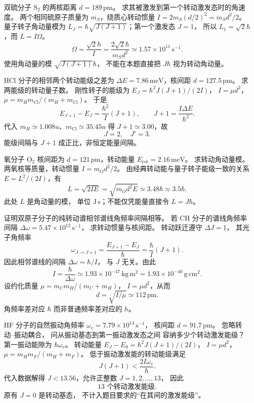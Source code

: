双硫分子 $\mathrm{S_2}$ 的两核距离 $d=189\,\mathrm{pm}$。
求其被激发到第一个转动激发态时的角速度。
\exsolution
两个相同硫原子质量为 $m_S$，绕质心转动惯量
$I=2m_S(d/2)^2=m_Sd^2/2$。
量子转子角动量模为
$L_J=\hbar\sqrt{J(J+1)}$；第一个激发态 $J=1$，
所以 $L_1=\sqrt2\hbar$，而 $L=I\Omega$。
\[
 \boxed{\Omega=\frac{\sqrt2\hbar}{I}
 =\frac{2\sqrt2\hbar}{m_Sd^2}
 \simeq1.57\times10^{11}\,\mathrm{s^{-1}}}.
\]
\excheck 使用角动量的模 $\sqrt{J(J+1)}\hbar$，
不能在本题直接把 $J\hbar$ 视为转动角动量。

HCl 分子的相邻两个转动能级之差为
$\Delta E=7.86\,\mathrm{meV}$，核间距
$d=127.5\,\mathrm{pm}$。
求两能级的转动量子数。
\exsolution
刚性转子的能级为
$E_J=\hbar^2J(J+1)/(2I)$，
$I=\mu d^2$，
$\mu=m_Hm_{\mathrm{Cl}}/(m_H+m_{\mathrm{Cl}})$。
于是
\[
 E_{J+1}-E_J=\frac{\hbar^2}{I}(J+1),\qquad
 J+1=\frac{I\Delta E}{\hbar^2}.
\]
代入 $m_H\simeq1.008u$、$m_{\mathrm{Cl}}\simeq35.45u$
得 $J+1\simeq3.00$，故
\[
 \boxed{J=2,\quad J'=3}.
\]
\excheck 能级间隔与 $J+1$ 成正比，非恒定能量间隔。

氧分子 $\mathrm{O_2}$ 核间距为
$d=121\,\mathrm{pm}$，转动能量
$E_{\mathrm{rot}}=2.16\,\mathrm{meV}$。
求转动角动量模。
\exsolution
两氧核等质量，转动惯量
$I=m_Od^2/2$。
由经典转动能与量子转子能级一致的关系
$E=L^2/(2I)$，有
\[
 \boxed{L=\sqrt{2IE}
 =\sqrt{m_Od^2E}
 \simeq3.48\hbar\approx3.5\hbar}.
\]
\excheck 此处 $L$ 是角动量的模，
单位 $\mathrm{J\,s}$；不能仅凭能量直接令 $L=J\hbar$。

证明双原子分子的纯转动谱相邻谱线角频率间隔相等。
若 CH 分子的谱线角频率间隔
$\Delta\omega=5.47\times10^{12}\,\mathrm{s^{-1}}$，
求转动惯量与核间距。
\exsolution
转动跃迁遵守 $\Delta J=1$，
其光子角频率
\[
 \omega_{J\to J+1}=
 \frac{E_{J+1}-E_J}{\hbar}
 =\frac{\hbar}{I}(J+1).
\]
因此相邻谱线的间隔
$\Delta\omega=\hbar/I$，
与 $J$ 无关。由此
\[
 \boxed{I=\frac{\hbar}{\Delta\omega}
 \simeq1.93\times10^{-47}\,\mathrm{kg\,m^2}
 =1.93\times10^{-40}\,\mathrm{g\,cm^2}}.
\]
设约化质量 $\mu=m_Cm_H/(m_C+m_H)$，
$I=\mu d^2$，从而
\[
 \boxed{d=\sqrt{I/\mu}\simeq112\,\mathrm{pm}}.
\]
\excheck 角频率差对应 $\hbar$ 而非普通频率差对应的 $h$。

HF 分子的自然振动角频率
$\omega_v=7.79\times10^{14}\,\mathrm{s^{-1}}$，
核间距 $d=91.7\,\mathrm{pm}$。
忽略转动--振动耦合，
问从振动基态到第一振动激发态之间
容纳多少个转动激发能级？
\exsolution
第一振动能隙为 $\hbar\omega_v$。
转动能量
$E_J-E_0=\hbar^2J(J+1)/(2I)$，
$I=\mu d^2$，$\mu=m_Hm_F/(m_H+m_F)$。
低于振动激发能的转动能级满足
\[
 J(J+1)<\frac{2I\omega_v}{\hbar}.
\]
代入数据解得
$J<13.56$，允许正整数 $J=1,2,\ldots,13$，
因此
\[
 \boxed{13\text{ 个转动激发能级}}.
\]
\excheck 原有 $J=0$ 是转动基态，
不计入题目要求的“在其间的激发能级”。

